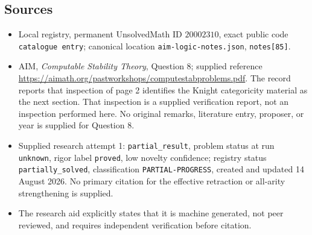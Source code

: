 \documentclass[11pt]{article}
\begin{document}
\subsection{Sources}
\begin{itemize}
\item Local registry, permanent UnsolvedMath ID \(20002310\), exact public code \texttt{catalogue entry}; canonical location \texttt{aim-logic-notes.json}, \texttt{notes[85]}.
\item AIM, \emph{Computable Stability Theory}, Question 8; supplied reference \url{https://aimath.org/pastworkshops/computestabproblems.pdf}. The record reports that inspection of page 2 identifies the Knight categoricity material as the next section. That inspection is a supplied verification report, not an inspection performed here. No original remarks, literature entry, proposer, or year is supplied for Question 8.
\item Supplied research attempt 1: \texttt{partial\_result}, problem status at run \texttt{unknown}, rigor label \texttt{proved}, low novelty confidence; registry status \texttt{partially\_solved}, classification \texttt{PARTIAL-PROGRESS}, created and updated 14 August 2026. No primary citation for the effective retraction or all-arity strengthening is supplied.
\item The research aid explicitly states that it is machine generated, not peer reviewed, and requires independent verification before citation.
\end{itemize}
\end{document}
